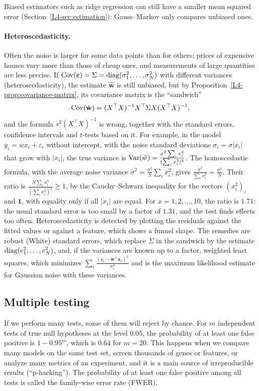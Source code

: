 Biased estimators such as ridge regression can still have a smaller mean squared error (Section~\ref{L4-sec:estimation}): Gauss--Markov only compares unbiased ones.

\paragraph{Heteroscedasticity.} Often the noise is larger for some data points than for others: prices of expensive houses vary more than those of cheap ones, and measurements of large quantities are less precise. If $\operatorname{Cov}(\boldsymbol{\varepsilon}) = \Sigma = \operatorname{diag}(\sigma_1^2, \ldots, \sigma_N^2)$ with different variances (heteroscedasticity), the estimate $\hat{\mathbf{w}}$ is still unbiased, but by Proposition~\ref{L4-prop:covariance-matrix}, its covariance matrix is the ``sandwich''
\[\operatorname{Cov}(\hat{\mathbf{w}}) = (X^\top X)^{-1}X^\top\Sigma X(X^\top X)^{-1},\]
and the formula $s^2(X^\top X)^{-1}$ is wrong, together with the standard errors, confidence intervals and $t$-tests based on it. For example, in the model $y_i = wx_i + \varepsilon_i$ without intercept, with the noise standard deviations $\sigma_i = \sigma|x_i|$ that grow with $|x_i|$, the true variance is $\operatorname{Var}(\hat w) = \frac{\sigma^2\sum_i x_i^4}{(\sum_i x_i^2)^2}$. The homoscedastic formula, with the average noise variance $\bar\sigma^2 = \frac{\sigma^2}{N}\sum_i x_i^2$, gives $\frac{\bar\sigma^2}{\sum_i x_i^2} = \frac{\sigma^2}{N}$. Their ratio is $\frac{N\sum_i x_i^4}{(\sum_i x_i^2)^2} \geq 1$, by the Cauchy--Schwarz inequality for the vectors $(x_i^2)_i$ and $\mathbf{1}$, with equality only if all $|x_i|$ are equal. For $x = 1, 2, \ldots, 10$, the ratio is $1.71$: the usual standard error is too small by a factor of $1.31$, and the test finds effects too often. Heteroscedasticity is detected by plotting the residuals against the fitted values or against a feature, which shows a funnel shape. The remedies are robust (White) standard errors, which replace $\Sigma$ in the sandwich by the estimate $\operatorname{diag}(e_1^2, \ldots, e_N^2)$, and, if the variances are known up to a factor, weighted least squares, which minimizes $\sum_i \frac{(y_i - \mathbf{w}^\top\mathbf{x}_i)^2}{\sigma_i^2}$ and is the maximum likelihood estimate for Gaussian noise with these variances.

\subsection{Multiple testing}

If we perform many tests, some of them will reject by chance. For $m$ independent tests of true null hypotheses at the level $0.05$, the probability of at least one false positive is $1 - 0.95^m$, which is $0.64$ for $m = 20$. This happens when we compare many models on the same test set, screen thousands of genes or features, or analyze many metrics of an experiment, and it is a main source of irreproducible results (``p-hacking''). The probability of at least one false positive among all tests is called the family-wise error rate (FWER).

